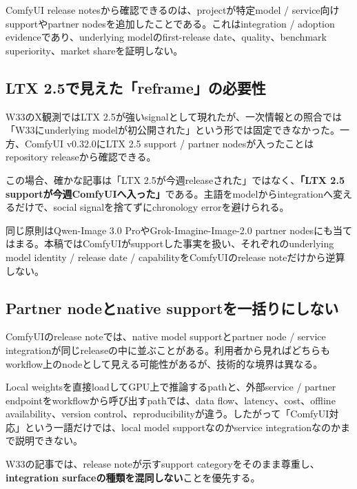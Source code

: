 \begin{claimboundary}
ComfyUI release notesから確認できるのは、projectが特定model / service向けsupportやpartner nodesを追加したことである\cite{comfyui-0320}。これはintegration / adoption evidenceであり、underlying modelのfirst-release date、quality、benchmark superiority、market shareを証明しない。
\end{claimboundary}

\subsection*{LTX 2.5で見えた「reframe」の必要性}

W33のX観測ではLTX 2.5が強いsignalとして現れたが、一次情報との照合では「W33にunderlying modelが初公開された」という形では固定できなかった。一方、ComfyUI v0.32.0にLTX 2.5 support / partner nodesが入ったことはrepository releaseから確認できる\cite{comfyui-0320,w33-grok-r3-review}。

この場合、確かな記事は「LTX 2.5が今週releaseされた」ではなく、\textbf{「LTX 2.5 supportが今週ComfyUIへ入った」}である。主語をmodelからintegrationへ変えるだけで、social signalを捨てずにchronology errorを避けられる。

同じ原則はQwen-Image 3.0 ProやGrok-Imagine-Image-2.0 partner nodesにも当てはまる。本稿ではComfyUIがsupportした事実を扱い、それぞれのunderlying model identity / release date / capabilityをComfyUIのrelease noteだけから逆算しない。

\subsection*{Partner nodeとnative supportを一括りにしない}

ComfyUIのrelease noteでは、native model supportとpartner node / service integrationが同じreleaseの中に並ぶことがある\cite{comfyui-0320}。利用者から見ればどちらもworkflow上のnodeとして見える可能性があるが、技術的な境界は異なる。

Local weightsを直接loadしてGPU上で推論するpathと、外部service / partner endpointをworkflowから呼び出すpathでは、data flow、latency、cost、offline availability、version control、reproducibilityが違う。したがって「ComfyUI対応」という一語だけでは、local model supportなのかservice integrationなのかまで説明できない。

W33の記事では、release noteが示すsupport categoryをそのまま尊重し、\textbf{integration surfaceの種類を混同しない}ことを優先する。

